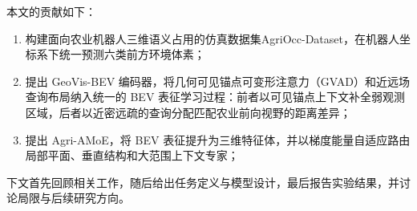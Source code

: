 本文的贡献如下：
\begin{enumerate}[leftmargin=1.8em]
  \item 构建面向农业机器人三维语义占用的仿真数据集AgriOcc-Dataset，在机器人坐标系下统一预测六类前方环境体素；
  \item 提出 GeoVis-BEV 编码器，将几何可见锚点可变形注意力（GVAD）和近远场查询布局纳入统一的 BEV 表征学习过程：前者以可见锚点上下文补全弱观测区域，后者以近密远疏的查询分配匹配农业前向视野的距离差异；
  \item 提出 Agri-AMoE，将 BEV 表征提升为三维特征体，并以梯度能量自适应路由局部平面、垂直结构和大范围上下文专家；
\end{enumerate}

下文首先回顾相关工作，随后给出任务定义与模型设计，最后报告实验结果，并讨论局限与后续研究方向。
